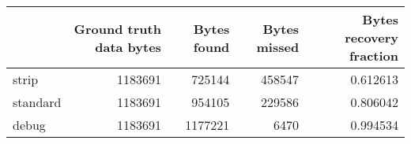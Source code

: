 \begin{tabular}{lrrrr}
\toprule
{} &  Ground truth data bytes &  Bytes found &  Bytes missed &  Bytes recovery fraction \\
\midrule
strip    &                  1183691 &       725144 &        458547 &                 0.612613 \\
standard &                  1183691 &       954105 &        229586 &                 0.806042 \\
debug    &                  1183691 &      1177221 &          6470 &                 0.994534 \\
\bottomrule
\end{tabular}
